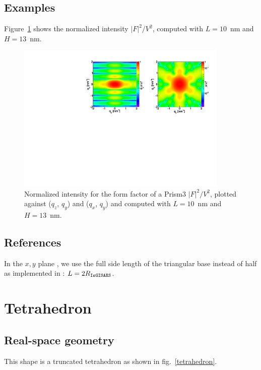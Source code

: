 \subsection{Examples}
Figure~\ref{figFFprism3Ex} shows the normalized intensity
$|F|^2/V^2$, computed with $L=10$~nm and $H=13$~nm.
\begin{figure}[h]
\begin{center}
\includegraphics[width=0.9\textwidth]{Figures/figffprism3}
\end{center}
\caption{Normalized intensity for the form factor of a Prism3
  $|F|^2/V^2$, plotted against ($q_z$, $q_y$) and  ($q_x$, $q_y$) and
  computed with $L=10$~nm and $H=13$~nm.}
\label{figFFprism3Ex}
\end{figure}

\subsection{References}
In the $x,y$ plane , we use the full side length of the triangular
base instead of  half as implemented in : $L= 2
R_{\rm{\texttt{IsGISAXS}}}$.

\newpage{\cleardoublepage}
\section{Tetrahedron}   
 
\subsection{Real-space geometry}
This shape is a truncated tetrahedron as shown in fig.~\ref{tetrahedron}.

